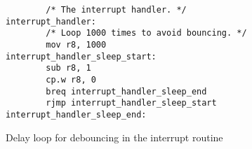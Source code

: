 \begin{figure}
\centering
\lstset{language=[Motorola68k]Assembler,basicstyle=\ttfamily,numbers=left,firstnumber=86}
\begin{lstlisting}
        /* The interrupt handler. */
interrupt_handler:
        /* Loop 1000 times to avoid bouncing. */
        mov r8, 1000
interrupt_handler_sleep_start:
        sub r8, 1
        cp.w r8, 0
        breq interrupt_handler_sleep_end
        rjmp interrupt_handler_sleep_start
interrupt_handler_sleep_end:
\end{lstlisting}
\caption{Delay loop for debouncing in the interrupt routine}
\label{lst:debouncing}
\end{figure}

